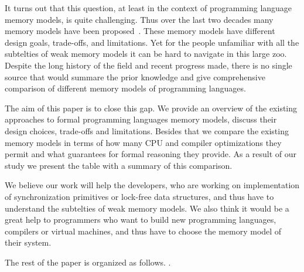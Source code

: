 \documentclass[a4paper,twoside,11pt]{article}
\numberwithin{equation}{section}
\begin{document}
It turns out that this question, 
at least in the context of programming language 
memory models, is quite challenging. 
Thus over the last two decades many memory models have been proposed~\cite{
Manson-al:POPL05, Batty-al:POPL11, Dolan-al:PLDI18, 
Watt-el:OOPSLA19, Watt-el:PLDI2020,
Jeffrey-Riely:LICS16, PichonPharabod-Sewell:POPL16, 
Kang-al:POPL17, Chakraborty-Vafeiadis:POPL19, 
Paviotti-el:ESOP20, Lee-el:PLDI20}. 
These memory models have different design goals, trade-offs, and limitations.
Yet for the people unfamiliar with all the subtelties 
of weak memory models it can be hard to navigate in this large zoo.
Despite the long history of the field and recent progress made, 
there is no single source that would summare the prior knowledge
and give comprehensive comparison of different memory models
of programming languages.

The aim of this paper is to close this gap.
We provide an overview of the existing approaches to 
formal programming languages memory models,
discuss their design choices, trade-offs and limitations.
Besides that we compare the existing memory models 
in terms of how many CPU and compiler optimizations 
they permit and what guarantees for formal reasoning they provide.
As a result of our study we present the table with a summary of this comparison.

We believe our work will help the developers,
who are working on implementation of synchronization primitives
or lock-free data structures, and thus have to understand 
the subtelties of weak memory models.
We also think it would be a great help to 
programmers who want to build new 
programming languages, compilers or virtual machines,
and thus have to choose the memory model of their system. 

The rest of the paper is organized as follows.
\todo{}.
\end{document}
